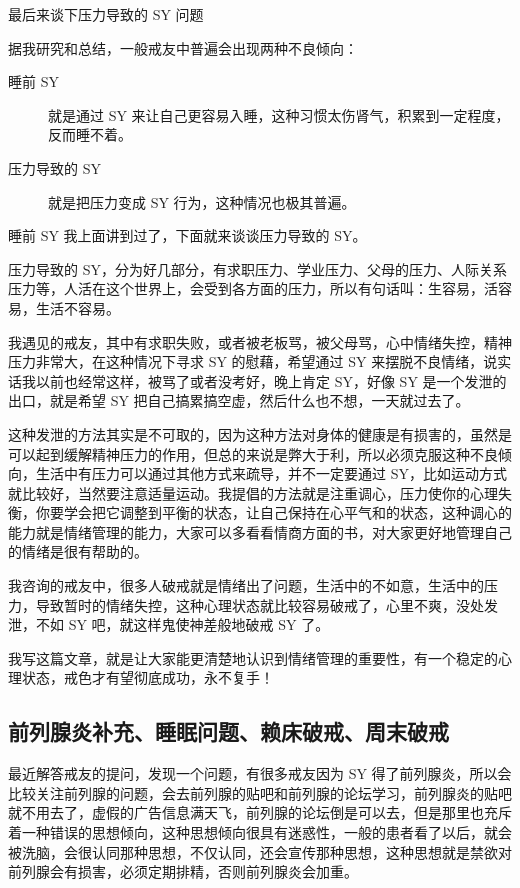 \documentclass[fontset=founder]{ctexart}
\begin{document}
最后来谈下压力导致的 SY 问题

据我研究和总结，一般戒友中普遍会出现两种不良倾向：

\begin{description}
    \item[睡前 SY] 就是通过 SY 来让自己更容易入睡，这种习惯太伤肾气，积累到一定程度，反而睡不着。
    \item[压力导致的 SY] 就是把压力变成 SY 行为，这种情况也极其普遍。
\end{description}

睡前 SY 我上面讲到过了，下面就来谈谈压力导致的 SY。

压力导致的 SY，分为好几部分，有求职压力、学业压力、父母的压力、人际关系压力等，人活在这个世界上，会受到各方面的压力，所以有句话叫：生容易，活容易，生活不容易。

我遇见的戒友，其中有求职失败，或者被老板骂，被父母骂，心中情绪失控，精神压力非常大，在这种情况下寻求 SY 的慰藉，希望通过 SY 来摆脱不良情绪，说实话我以前也经常这样，被骂了或者没考好，晚上肯定 SY，好像 SY 是一个发泄的出口，就是希望 SY 把自己搞累搞空虚，然后什么也不想，一天就过去了。

这种发泄的方法其实是不可取的，因为这种方法对身体的健康是有损害的，虽然是可以起到缓解精神压力的作用，但总的来说是弊大于利，所以必须克服这种不良倾向，生活中有压力可以通过其他方式来疏导，并不一定要通过 SY，比如运动方式就比较好，当然要注意适量运动。我提倡的方法就是注重调心，压力使你的心理失衡，你要学会把它调整到平衡的状态，让自己保持在心平气和的状态，这种调心的能力就是情绪管理的能力，大家可以多看看情商方面的书，对大家更好地管理自己的情绪是很有帮助的。

我咨询的戒友中，很多人破戒就是情绪出了问题，生活中的不如意，生活中的压力，导致暂时的情绪失控，这种心理状态就比较容易破戒了，心里不爽，没处发泄，不如 SY 吧，就这样鬼使神差般地破戒 SY 了。

我写这篇文章，就是让大家能更清楚地认识到情绪管理的重要性，有一个稳定的心理状态，戒色才有望彻底成功，永不复手！

\subsection{前列腺炎补充、睡眠问题、赖床破戒、周末破戒}

最近解答戒友的提问，发现一个问题，有很多戒友因为 SY 得了前列腺炎，所以会比较关注前列腺的问题，会去前列腺的贴吧和前列腺的论坛学习，前列腺炎的贴吧就不用去了，虚假的广告信息满天飞，前列腺的论坛倒是可以去，但是那里也充斥着一种错误的思想倾向，这种思想倾向很具有迷惑性，一般的患者看了以后，就会被洗脑，会很认同那种思想，不仅认同，还会宣传那种思想，这种思想就是禁欲对前列腺会有损害，必须定期排精，否则前列腺炎会加重。
\end{document}
